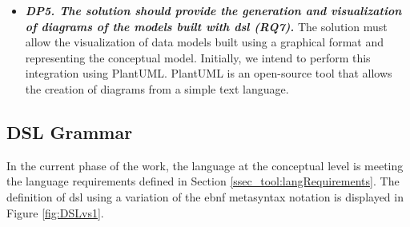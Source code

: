 \begin{itemize}
    \item\textit{\textbf{DP5. The solution should provide the generation and visualization of diagrams of the models built with \ac{dsl} (RQ7).}}
    The solution must allow the visualization of data models built using a graphical format and representing the conceptual model.
    Initially, we intend to perform this integration using PlantUML.
    PlantUML is an open-source tool that allows the creation of diagrams from a simple text language.
\end{itemize}


\subsection{DSL Grammar} \label{ssec_tool:grammar}

In the current phase of the work, the language at the conceptual level is meeting the language requirements defined in Section \ref{ssec_tool:langRequirements}.
The definition of \ac{dsl} using a variation of the \ac{ebnf} metasyntax notation is displayed in Figure \autoref{fig:DSLvs1}.


